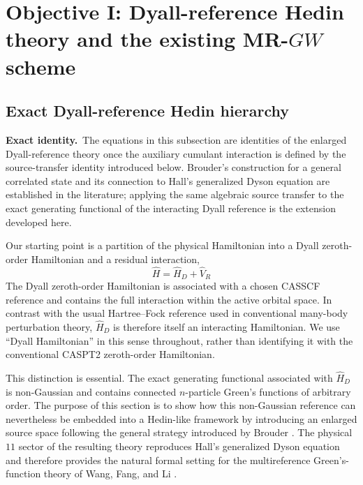 \documentclass[aip,jcp,reprint,noshowkeys,superscriptaddress]{revtex4-1}
\newcommand{\Exact}{\textbf{Exact identity.}\ }
\begin{document}
\section{Objective I: Dyall-reference Hedin theory and the existing MR-$GW$ scheme}
\label{sec:objective-I}
\subsection{Exact Dyall-reference Hedin hierarchy}
\label{sec:dyall-hedin}

\Exact The equations in this subsection are identities of the enlarged
Dyall-reference theory once the auxiliary cumulant interaction is defined by
the source-transfer identity introduced below.  Brouder's construction for a
general correlated state and its connection to Hall's generalized Dyson
equation are established in the literature; applying the same algebraic
source transfer to the exact generating functional of the interacting Dyall
reference is the extension developed here.


Our starting point is a partition of the physical Hamiltonian into a
Dyall zeroth-order Hamiltonian and a residual interaction,
\begin{equation}
  \hat H = \hat H_D + \hat V_R
  \label{eq:dyall-partition}
\end{equation}
The Dyall zeroth-order Hamiltonian is associated with a chosen CASSCF
reference and contains the full interaction within the active orbital space.
In contrast with the usual Hartree--Fock reference used in conventional
many-body perturbation theory, $\hat H_D$ is therefore itself an interacting
Hamiltonian.  We use ``Dyall Hamiltonian'' in this sense throughout, rather
than identifying it with the conventional CASPT2 zeroth-order Hamiltonian.

This distinction is essential.  The exact generating functional
associated with $\hat H_D$ is non-Gaussian and contains connected
$n$-particle Green's functions of arbitrary order.  The purpose of this
section is to show how this non-Gaussian reference can nevertheless be
embedded into a Hedin-like framework by introducing an enlarged source
space following the general strategy introduced by Brouder
\cite{Brouder2007}.  The physical $11$ sector of the resulting theory
reproduces Hall's generalized Dyson equation and therefore provides the
natural formal setting for the multireference Green's-function theory of
Wang, Fang, and Li \cite{WangFangLi2026}.
\end{document}
